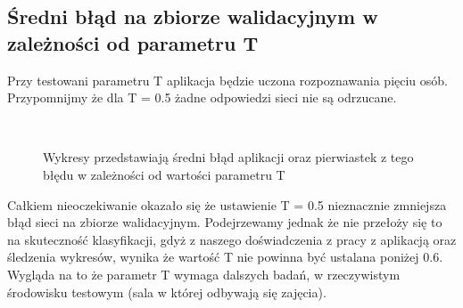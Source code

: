 \documentclass[a4paper]{article}
\begin{document}
	\subsection{Średni błąd na zbiorze walidacyjnym w zależności od parametru T}
		Przy testowani parametru T aplikacja będzie uczona rozpoznawania pięciu osób.
		Przypomnijmy że dla T = 0.5 żadne odpowiedzi sieci nie są odrzucane.
		\begin{figure}[h]	
  		\centering
{}\\
  		\caption{Wykresy przedstawiają średni błąd aplikacji oraz pierwiastek z tego błędu w
  		zależności od wartości parametru T}
  		\label{fig:texp1}
	\end{figure}
	Całkiem nieoczekiwanie okazało się że ustawienie T = 0.5 nieznacznie zmniejsza błąd 
	sieci na zbiorze walidacyjnym. Podejrzewamy jednak że nie przełoży się to na skuteczność klasyfikacji,
	gdyż z naszego doświadczenia z pracy z aplikacją oraz śledzenia wykresów, wynika że wartość T nie
	powinna być ustalana poniżej 0.6. Wygląda na to że parametr T wymaga dalszych badań, 
	w rzeczywistym środowisku testowym (sala w której odbywają się zajęcia).
		
\end{document}
